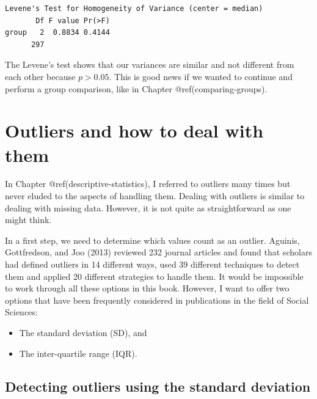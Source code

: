\documentclass[
  letterpaper,
]{krantz}
\makeatletter
\newenvironment{Shaded}{\begin{snugshade}}{\end{snugshade}}
\newcommand{\FunctionTok}[1]{\textcolor[rgb]{0.28,0.35,0.67}{#1}}
\newcommand{\NormalTok}[1]{\textcolor[rgb]{0.00,0.23,0.31}{#1}}
\newcommand{\SpecialCharTok}[1]{\textcolor[rgb]{0.37,0.37,0.37}{#1}}
\newenvironment{kframe}{%
\medskip{}
\setlength{\fboxsep}{.8em}
 \def\at@end@of@kframe{}%
 \ifinner\ifhmode%
  \def\at@end@of@kframe{\end{minipage}}%
  \begin{minipage}{\columnwidth}%
 \fi\fi%
 \def\FrameCommand##1{\hskip\@totalleftmargin \hskip-\fboxsep
 \colorbox{shadecolor}{##1}\hskip-\fboxsep
     \hskip-\linewidth \hskip-\@totalleftmargin \hskip\columnwidth}%
 \MakeFramed {\advance\hsize-\width
   \@totalleftmargin\z@ \linewidth\hsize
   \@setminipage}}%
 {\par\unskip\endMakeFramed%
 \at@end@of@kframe}
\renewenvironment{Shaded}{\begin{kframe}}{\end{kframe}}
\makeatother
\begin{document}
\begin{Shaded}
\end{Shaded}

\begin{verbatim}
Levene's Test for Homogeneity of Variance (center = median)
       Df F value Pr(>F)
group   2  0.8834 0.4144
      297               
\end{verbatim}

The Levene's test shows that our variances are similar and not different
from each other because \(p > 0.05\). This is good news if we wanted to
continue and perform a group comparison, like in Chapter
@ref(comparing-groups).

\section{Outliers and how to deal with
them}\label{sec-dealing-with-outliers}

In Chapter @ref(descriptive-statistics), I referred to outliers many
times but never eluded to the aspects of handling them. Dealing with
outliers is similar to dealing with missing data. However, it is not
quite as straightforward as one might think.

In a first step, we need to determine which values count as an outlier.
Aguinis, Gottfredson, and Joo (2013) reviewed 232 journal articles and
found that scholars had defined outliers in 14 different ways, used 39
different techniques to detect them and applied 20 different strategies
to handle them. It would be impossible to work through all these options
in this book. However, I want to offer two options that have been
frequently considered in publications in the field of Social Sciences:

\begin{itemize}
\item
  The standard deviation (SD), and
\item
  The inter-quartile range (IQR).
\end{itemize}

\subsection{Detecting outliers using the standard
deviation}\label{sec-ouliers-standard_deviation}
\end{document}
